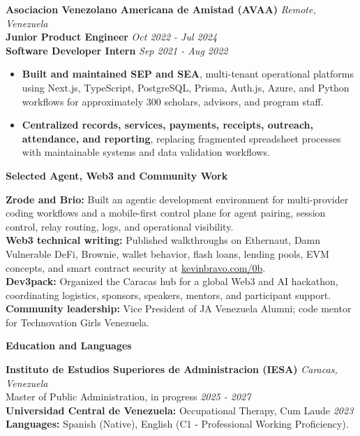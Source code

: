 \documentclass[10pt]{article}
\newcommand{\sectiontitle}[1]{%
    \vspace{3pt}
    \begin{center}
        \textbf{#1}
    \end{center}
    \vspace{-5pt}
}
\begin{document}
\vspace{1pt}
\textbf{Asociacion Venezolano Americana de Amistad (AVAA)} \hfill \textit{Remote, Venezuela} \\
\textbf{Junior Product Engineer} \hfill \textit{Oct 2022 - Jul 2024} \\
\textbf{Software Developer Intern} \hfill \textit{Sep 2021 - Aug 2022}
\begin{itemize}
    \item \textbf{Built and maintained SEP and SEA}, multi-tenant operational platforms using Next.js, TypeScript, PostgreSQL, Prisma, Auth.js, Azure, and Python workflows for approximately 300 scholars, advisors, and program staff.
    \item \textbf{Centralized records, services, payments, receipts, outreach, attendance, and reporting}, replacing fragmented spreadsheet processes with maintainable systems and data validation workflows.
\end{itemize}

\sectiontitle{Selected Agent, Web3 and Community Work}
\textbf{Zrode and Brio:} Built an agentic development environment for multi-provider coding workflows and a mobile-first control plane for agent pairing, session control, relay routing, logs, and operational visibility. \\
\textbf{Web3 technical writing:} Published walkthroughs on Ethernaut, Damn Vulnerable DeFi, Brownie, wallet behavior, flash loans, lending pools, EVM concepts, and smart contract security at \href{https://kevinbravo.com/0b}{kevinbravo.com/0b}. \\
\textbf{Dev3pack:} Organized the Caracas hub for a global Web3 and AI hackathon, coordinating logistics, sponsors, speakers, mentors, and participant support. \\
\textbf{Community leadership:} Vice President of JA Venezuela Alumni; code mentor for Technovation Girls Venezuela.

\sectiontitle{Education and Languages}
\textbf{Instituto de Estudios Superiores de Administracion (IESA)} \hfill \textit{Caracas, Venezuela} \\
Master of Public Administration, in progress \hfill \textit{2025 - 2027} \\
\textbf{Universidad Central de Venezuela:} Occupational Therapy, Cum Laude \hfill \textit{2023} \\
\textbf{Languages:} Spanish (Native), English (C1 - Professional Working Proficiency).
\end{document}
